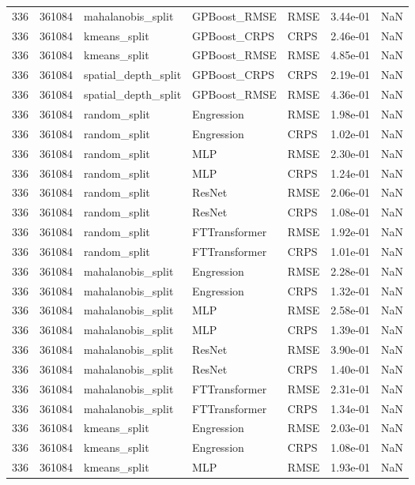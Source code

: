 \begin{tabular}{rrlllrr}
336 & 361084 & mahalanobis\_split & GPBoost\_RMSE & RMSE & 3.44e-01 & NaN \\
336 & 361084 & kmeans\_split & GPBoost\_CRPS & CRPS & 2.46e-01 & NaN \\
336 & 361084 & kmeans\_split & GPBoost\_RMSE & RMSE & 4.85e-01 & NaN \\
336 & 361084 & spatial\_depth\_split & GPBoost\_CRPS & CRPS & 2.19e-01 & NaN \\
336 & 361084 & spatial\_depth\_split & GPBoost\_RMSE & RMSE & 4.36e-01 & NaN \\
336 & 361084 & random\_split & Engression & RMSE & 1.98e-01 & NaN \\
336 & 361084 & random\_split & Engression & CRPS & 1.02e-01 & NaN \\
336 & 361084 & random\_split & MLP & RMSE & 2.30e-01 & NaN \\
336 & 361084 & random\_split & MLP & CRPS & 1.24e-01 & NaN \\
336 & 361084 & random\_split & ResNet & RMSE & 2.06e-01 & NaN \\
336 & 361084 & random\_split & ResNet & CRPS & 1.08e-01 & NaN \\
336 & 361084 & random\_split & FTTransformer & RMSE & 1.92e-01 & NaN \\
336 & 361084 & random\_split & FTTransformer & CRPS & 1.01e-01 & NaN \\
336 & 361084 & mahalanobis\_split & Engression & RMSE & 2.28e-01 & NaN \\
336 & 361084 & mahalanobis\_split & Engression & CRPS & 1.32e-01 & NaN \\
336 & 361084 & mahalanobis\_split & MLP & RMSE & 2.58e-01 & NaN \\
336 & 361084 & mahalanobis\_split & MLP & CRPS & 1.39e-01 & NaN \\
336 & 361084 & mahalanobis\_split & ResNet & RMSE & 3.90e-01 & NaN \\
336 & 361084 & mahalanobis\_split & ResNet & CRPS & 1.40e-01 & NaN \\
336 & 361084 & mahalanobis\_split & FTTransformer & RMSE & 2.31e-01 & NaN \\
336 & 361084 & mahalanobis\_split & FTTransformer & CRPS & 1.34e-01 & NaN \\
336 & 361084 & kmeans\_split & Engression & RMSE & 2.03e-01 & NaN \\
336 & 361084 & kmeans\_split & Engression & CRPS & 1.08e-01 & NaN \\
336 & 361084 & kmeans\_split & MLP & RMSE & 1.93e-01 & NaN \\

\end{tabular}
